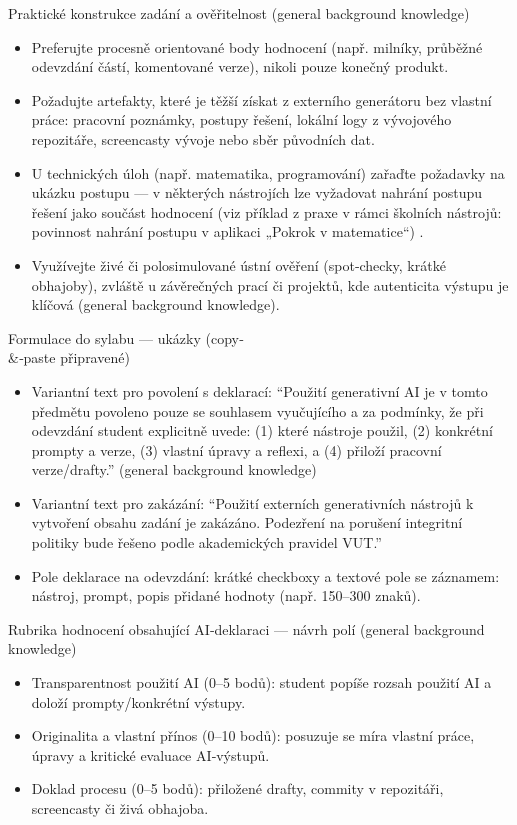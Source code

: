 Praktické konstrukce zadání a ověřitelnost (general background knowledge)
\begin{itemize}
  \item Preferujte procesně orientované body hodnocení (např. milníky, průběžné odevzdání částí, komentované verze), nikoli pouze konečný produkt.
  \item Požadujte artefakty, které je těžší získat z externího generátoru bez vlastní práce: pracovní poznámky, postupy řešení, lokální logy z vývojového repozitáře, screencasty vývoje nebo sběr původních dat.
  \item U technických úloh (např. matematika, programování) zařaďte požadavky na ukázku postupu — v některých nástrojích lze vyžadovat nahrání postupu řešení jako součást hodnocení (viz příklad z praxe v rámci školních nástrojů: povinnost nahrání postupu v aplikaci „Pokrok v matematice“) \cite{kb_ai_101_tipu_pdf_04e4a115_page_8_1}.
  \item Využívejte živé či polosimulované ústní ověření (spot‑checky, krátké obhajoby), zvláště u závěrečných prací či projektů, kde autenticita výstupu je klíčová (general background knowledge).
\end{itemize}

Formulace do sylabu — ukázky (copy‑\\ \&‑paste připravené)
\begin{itemize}
  \item Variantní text pro povolení s deklarací: ``Použití generativní AI je v tomto předmětu povoleno pouze se souhlasem vyučujícího a za podmínky, že při odevzdání student explicitně uvede: (1) které nástroje použil, (2) konkrétní prompty a verze, (3) vlastní úpravy a reflexi, a (4) přiloží pracovní verze/drafty.'' (general background knowledge)
  \item Variantní text pro zakázání: ``Použití externích generativních nástrojů k vytvoření obsahu zadání je zakázáno. Podezření na porušení integritní politiky bude řešeno podle akademických pravidel VUT.''
  \item Pole deklarace na odevzdání: krátké checkboxy a textové pole se záznamem: nástroj, prompt, popis přidané hodnoty (např. 150–300 znaků).
\end{itemize}

Rubrika hodnocení obsahující AI‑deklaraci — návrh polí (general background knowledge)
\begin{itemize}
  \item Transparentnost použití AI (0–5 bodů): student popíše rozsah použití AI a doloží prompty/konkrétní výstupy.
  \item Originalita a vlastní přínos (0–10 bodů): posuzuje se míra vlastní práce, úpravy a kritické evaluace AI‑výstupů.
  \item Doklad procesu (0–5 bodů): přiložené drafty, commity v repozitáři, screencasty či živá obhajoba.
\end{itemize}

